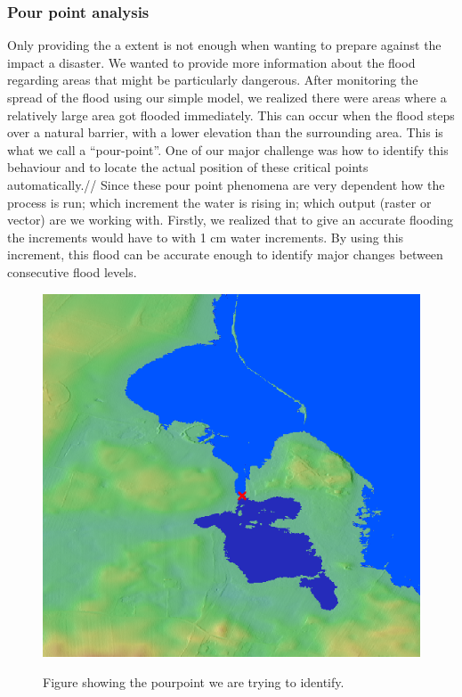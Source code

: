 \subsubsection{Pour point analysis}
Only providing the a extent is not enough when wanting to prepare against the impact a disaster. We wanted to provide more information about the flood regarding areas that might be particularly dangerous. After monitoring the  spread of the flood using our simple model, we realized there were areas where a relatively large area got flooded immediately. This can occur when the flood steps over a natural barrier, with a lower elevation than the surrounding area. This is what we call a “pour-point”. One of our major challenge was how to identify this behaviour and to locate the actual position of these critical points automatically.// 
Since these pour point phenomena are very dependent how the process is run; which increment the water is rising in; which output (raster or vector) are we working with. Firstly, we realized that to give an accurate flooding the increments would have to with 1 cm water increments. By using this increment, this flood can be accurate enough to identify major changes between consecutive flood levels.

\begin{figure}[h!]
\centering
	{\includegraphics[width=0.80\linewidth]{gfx/Pourpoint.png}}
\caption{Figure showing the pourpoint we are trying to identify.}
\label{fig:pourpoint}
\end{figure}

